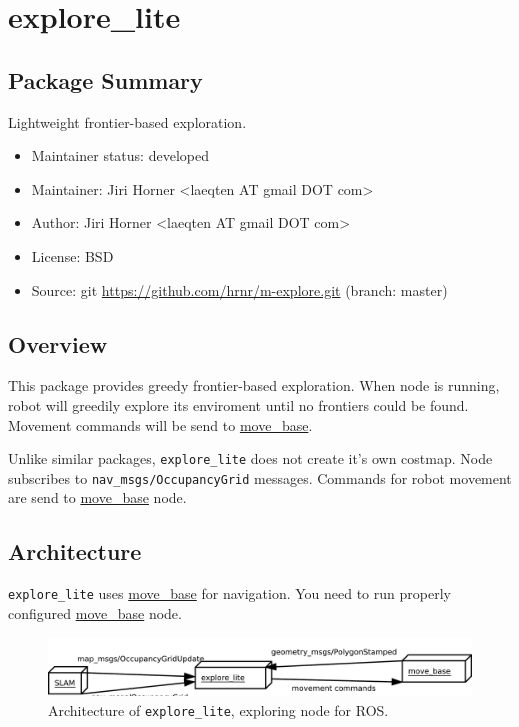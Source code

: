 \chapter{explore\_lite}

\section{Package Summary}

Lightweight frontier-based exploration.

\begin{itemize}
    \item Maintainer status: developed
    \item Maintainer: Jiri Horner \textless laeqten AT gmail DOT com\textgreater
    \item Author: Jiri Horner  \textless laeqten AT gmail DOT com\textgreater
    \item License: BSD
    \item Source: git \url{https://github.com/hrnr/m-explore.git} (branch: master)
\end{itemize}

\section{Overview}

This package provides greedy frontier-based exploration. When node is running, robot will greedily explore its enviroment until no frontiers could be found. Movement commands will be send to \href{http://wiki.ros.org/move_base}{move\_base}.


Unlike similar packages, \texttt{explore\_lite} does not create it's own costmap. Node subscribes to \texttt{nav\_msgs/OccupancyGrid} messages. Commands for robot movement are send to \href{http://wiki.ros.org/move_base}{move\_base} node.

\section{Architecture}

\texttt{explore\_lite} uses \href{http://wiki.ros.org/move_base}{move\_base} for navigation. You need to run properly configured \href{http://wiki.ros.org/move_base}{move\_base} node.

\begin{figure}
    \centering
    \includegraphics[width=\textwidth]{../img/explore_architecture.pdf}
    \caption{Architecture of \texttt{explore\_lite}, exploring node for \gls{ROS}.}
    \label{fig:mapmergearchitecture}
\end{figure}

